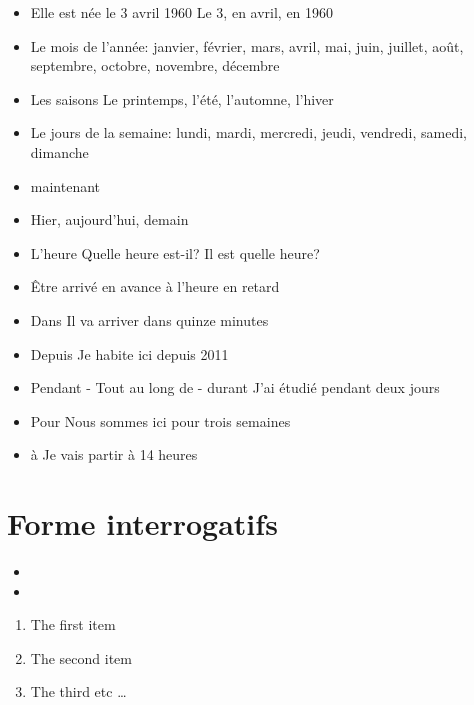 \documentclass[12pt]{article}  %
\begin{document}
\begin{itemize}
  \item Elle est née le 3 avril 1960  
  	\subitem Le 3, en avril, en 1960
  \item Le mois de l'année:   
  	\subitem janvier, février, mars, avril, mai, juin, juillet, août, septembre, octobre, novembre, décembre
\item Les saisons
	\subitem Le printemps, l'été, l'automne, l'hiver
  \item Le jours de la semaine:   
  	\subitem lundi, mardi, mercredi, jeudi, vendredi, samedi, dimanche
  \item maintenant
  \item Hier, aujourd'hui, demain
  \item L'heure
    \subitem Quelle heure est-il? Il est quelle heure?
  \item Être arrivé
  	\subitem en avance
  	\subitem à l'heure
  	\subitem en retard
  \item Dans
         \subitem Il va arriver dans quinze minutes
  \item Depuis
	\subitem Je habite ici depuis 2011
  \item Pendant - Tout au long de - durant
	\subitem J'ai étudié pendant deux jours
  \item Pour
         \subitem Nous sommes ici pour trois semaines
 \item à
	\subitem Je vais partir à 14 heures 
\end{itemize}

\section{Forme interrogatifs}

\begin{itemize}
  \item {}
  \item {}
  \subitem
\end{itemize}

\begin{enumerate}
  \item The first item
  \item The second item
  \item The third etc \ldots
\end{enumerate}
\end{document}
